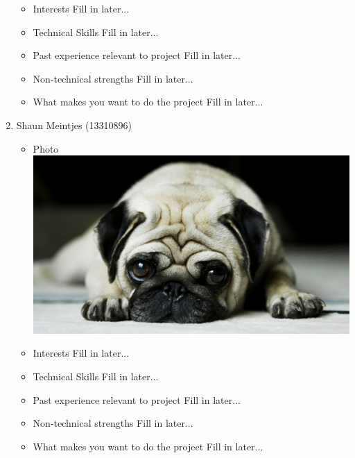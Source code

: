 \documentclass[12pt, oneside]{article}
\begin{document}
\begin{enumerate}
\begin{itemize}
			\item Interests\newline
				Fill in later...
			\item Technical Skills\newline
				Fill in later...
			\item Past experience relevant to project\newline
				Fill in later...
			\item Non-technical strengths\newline
				Fill in later...
			\item What makes you want to do the project\newline
				Fill in later...
		\end{itemize}
		\item {Shaun Meintjes (13310896)\par}
		\begin{itemize}
			\item Photo\newline
				\includegraphics[scale=0.1]{example} %
			\item Interests\newline
				Fill in later...
			\item Technical Skills\newline
				Fill in later...
			\item Past experience relevant to project\newline
				Fill in later...
			\item Non-technical strengths\newline
				Fill in later...
			\item What makes you want to do the project\newline
				Fill in later...
		\end{itemize}
	\end{enumerate}
	
\end{document}
